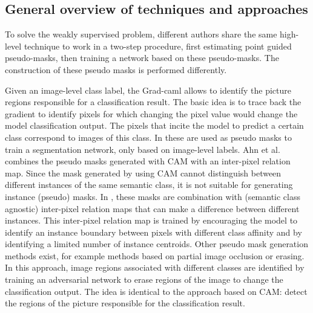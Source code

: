 \subsection{General overview of techniques and approaches}
\par{
    To solve the weakly supervised problem, different authors\cite{Laradji2019,Laradji2019a, Ahn2019,McEver2020} share the same high-level technique to work in a two-step procedure, first estimating point guided pseudo-masks, then training a network based on these pseudo-masks.
    The construction of these pseudo masks is performed differently.
}
\par{
    Given an image-level class label, the Grad-\Gls{caml} \cite{Selvaraju2020} allows to identify the picture regions responsible for a classification result.
    The basic idea is to trace back the gradient to identify pixels for which changing the pixel value would change the model classification output.
    The pixels that incite the model to predict a certain class correspond to images of this class. In \cite{Selvaraju2020} these are used as pseudo masks to train a segmentation network, only based on image-level labels.
    Ahn et al. \cite{Ahn2019} combines the pseudo masks generated with CAM with an inter-pixel relation map.
    Since the mask generated by using CAM cannot distinguish between different instances of the same semantic class, it is not suitable for generating instance (pseudo) masks.
    In \cite{Ahn2019}, these masks are combination with (semantic class agnostic) inter-pixel relation maps that can make a difference between different instances.
    This inter-pixel relation map is trained by encouraging the model to identify an instance boundary between pixels with different class affinity and by identifying a limited number of instance centroids.
    Other pseudo mask generation methods exist, for example methods based on partial image occlusion or erasing\cite{Wei2017}.
    In this approach, image regions associated with different classes are identified by training an adversarial network to erase regions of the image to change the classification output.
    The idea is identical to the approach based on CAM: detect the regions of the picture responsible for the classification result.
}
